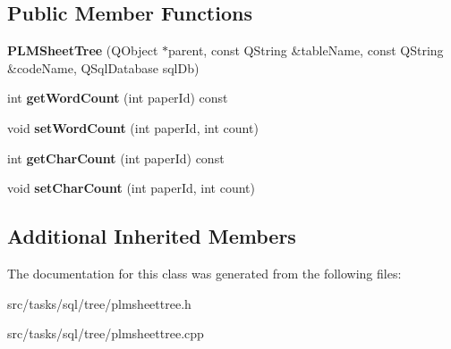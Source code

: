 \subsection*{Public Member Functions}
\begin{DoxyCompactItemize}
\item 
{\bfseries P\+L\+M\+Sheet\+Tree} (Q\+Object $\ast$parent, const Q\+String \&table\+Name, const Q\+String \&code\+Name, Q\+Sql\+Database sql\+Db)\hypertarget{class_p_l_m_sheet_tree_a02533e0502f7fd1bc72bcc3ef536ab5b}{}\label{class_p_l_m_sheet_tree_a02533e0502f7fd1bc72bcc3ef536ab5b}

\item 
int {\bfseries get\+Word\+Count} (int paper\+Id) const \hypertarget{class_p_l_m_sheet_tree_aab39b4df45f6b071e76ed1ddfa4b0637}{}\label{class_p_l_m_sheet_tree_aab39b4df45f6b071e76ed1ddfa4b0637}

\item 
void {\bfseries set\+Word\+Count} (int paper\+Id, int count)\hypertarget{class_p_l_m_sheet_tree_afbc394cb6beb9de2e836042c25f1e30a}{}\label{class_p_l_m_sheet_tree_afbc394cb6beb9de2e836042c25f1e30a}

\item 
int {\bfseries get\+Char\+Count} (int paper\+Id) const \hypertarget{class_p_l_m_sheet_tree_a8458181a36e69f8c0275141de15a058f}{}\label{class_p_l_m_sheet_tree_a8458181a36e69f8c0275141de15a058f}

\item 
void {\bfseries set\+Char\+Count} (int paper\+Id, int count)\hypertarget{class_p_l_m_sheet_tree_a2cc0cfe04bae86453675b3aeadea3581}{}\label{class_p_l_m_sheet_tree_a2cc0cfe04bae86453675b3aeadea3581}

\end{DoxyCompactItemize}
\subsection*{Additional Inherited Members}


The documentation for this class was generated from the following files\+:\begin{DoxyCompactItemize}
\item 
src/tasks/sql/tree/plmsheettree.\+h\item 
src/tasks/sql/tree/plmsheettree.\+cpp\end{DoxyCompactItemize}
